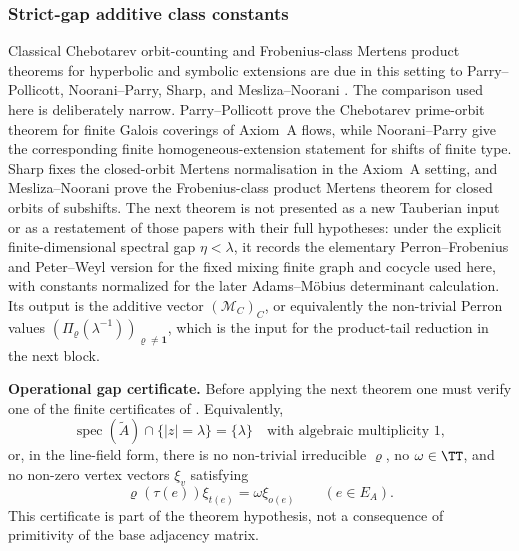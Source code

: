 \subsubsection{Strict-gap additive class constants}

Classical Chebotarev orbit-counting and Frobenius-class Mertens product
theorems for hyperbolic and symbolic extensions are due in this setting to
Parry--Pollicott, Noorani--Parry, Sharp, and Mesliza--Noorani
\cite{ParryPollicott1986Chebotarev,NooraniParry1992ChebotarevShifts,Sharp1991Mertens,MeslizaNoorani1999FrobeniusMertens}.
The comparison used here is deliberately narrow.  Parry--Pollicott prove the
Chebotarev prime-orbit theorem for finite Galois coverings of Axiom~A flows,
while Noorani--Parry give the corresponding finite homogeneous-extension
statement for shifts of finite type.  Sharp fixes the closed-orbit Mertens
normalisation in the Axiom~A setting, and Mesliza--Noorani prove the
Frobenius-class product Mertens theorem for closed orbits of subshifts.  The
next theorem is not presented as a new Tauberian input or as a restatement of
those papers with their full hypotheses: under the explicit finite-dimensional
spectral gap \(\eta<\lambda\), it records the elementary Perron--Frobenius and
Peter--Weyl version for the fixed mixing finite graph and cocycle used here,
with constants normalized for the later Adams--M\"obius determinant
calculation.
Its output is the additive vector \((\mathcal M_C)_C\), or equivalently the
non-trivial Perron values \((\Pi_\varrho(\lambda^{-1}))_{\varrho\ne\mathbf1}\),
which is the input for the product-tail reduction in the next block.

\noindent\textbf{Operational gap certificate.}
Before applying the next theorem one must verify one of the finite certificates
of .  Equivalently,
\[
  \operatorname{spec}(\widetilde A)\cap\{|z|=\lambda\}=\{\lambda\}
  \quad\text{with algebraic multiplicity }1,
\]
or, in the line-field form, there is no non-trivial irreducible
\(\varrho\), no \(\omega\in\TT\), and no non-zero vertex vectors
\(\xi_v\) satisfying
\[
  \varrho(\tau(e))\xi_{t(e)}=\omega\xi_{o(e)}
  \qquad(e\in E_A).
\]
This certificate is part of the theorem hypothesis, not a consequence of
primitivity of the base adjacency matrix.

